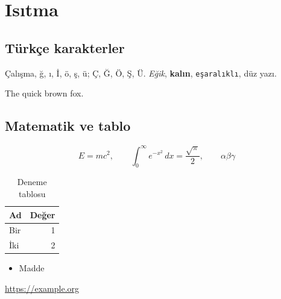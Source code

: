 \documentclass[a4paper,11pt,openany,oneside]{book}
\begin{document}
\frontmatter
\tableofcontents
\mainmatter
\chapter{Isıtma}
\section{Türkçe karakterler}
Çalışma, ğ, ı, İ, ö, ş, ü; Ç, Ğ, Ö, Ş, Ü. \textit{Eğik}, \textbf{kalın}, \texttt{eşaralıklı}, \textsf{düz yazı}.
\begin{otherlanguage}{english}The quick brown fox.\end{otherlanguage}
\section{Matematik ve tablo}
\[ E = mc^2, \qquad \int_0^\infty e^{-x^2}\,dx = \frac{\sqrt{\pi}}{2}, \qquad \alpha\beta\gamma \]
\begin{table}[H]\centering
\begin{tabular}{lr}\toprule Ad & Değer \\ \midrule Bir & 1 \\ İki & 2 \\ \bottomrule\end{tabular}
\caption{Deneme tablosu}
\end{table}
\begin{itemize}\item Madde\end{itemize}
\url{https://example.org}
\end{document}
